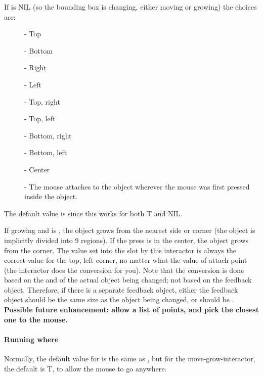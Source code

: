 If  is NIL (so the bounding box is changing, either moving or
growing) the choices are:
\begin{description}
\item[]  - Top

\item[]  - Bottom

\item[]  - Right

\item[]  - Left

\item[]  - Top, right

\item[]  - Top, left

\item[]  - Bottom, right

\item[]  - Bottom, left

\item[]  - Center

\item[]  - The mouse attaches to the object
wherever the mouse was first pressed inside the object.
\end{description}
The default value is  since this works for both 
T and NIL.

If growing and  is , the object
grows from the nearest side or corner (the object is implicitly divided into 9
regions).  If the press is in the center, the object grows from the
 corner.
The value set into the  slot by this interactor is always the correct value
for the top, left corner, no matter what the value of attach-point (the
interactor does the conversion for you).  Note that the conversion is done
based on the  and  of the actual object being changed; not based on the feedback object.
Therefore, if there is a separate feedback object, either
the feedback object should be the same size as the object being changed, or
 should be .
{\bf Possible future enhancement:
allow a list of points, and pick the closest one to the mouse.}

\paragraph{Running where}
Normally, the default value for 
is the same as , but for the move-grow-interactor, the
default  is T, to allow the mouse to go anywhere.

